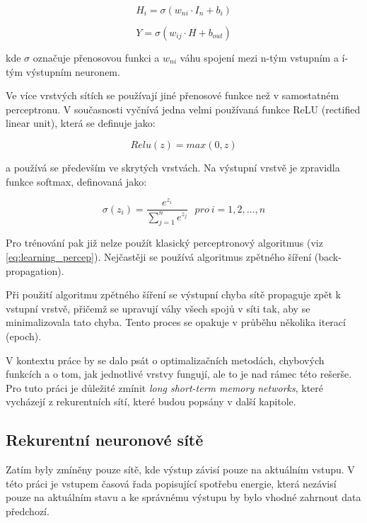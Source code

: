 \documentclass[FM,BP,fonts]{tulthesis}
\begin{document}
\begin{equation}
	H_i = \sigma(w_{ni} \cdot I_n + b_i)
\end{equation}


\begin{equation}
	Y = \sigma(w_{ij} \cdot H + b_{out})
\end{equation}

kde $\sigma$ označuje přenosovou funkci a $w_{ni}$ váhu spojení mezi n-tým vstupním a í-tým výstupním neuronem.

Ve více vrstvých sítích se používají jiné přenosové funkce než v samostatném perceptronu. V současnosti vyčnívá jedna velmi používaná funkce ReLU (rectified linear unit), která se definuje jako:

\begin{equation}
	Relu(z) = max(0, z)
\end{equation}

a používá se především ve skrytých vrstvách. \cite{brownlee2019gentle} Na výstupní vrstvě je zpravidla funkce softmax, definovaná jako:

\begin{equation}
	\sigma(z_i) = \frac{e^{z_{i}}}{\sum_{j=1}^n e^{z_{j}}} \ \ \ pro\ i=1,2,\dots,n
\end{equation}

Pro trénování pak již nelze použít klasický perceptronový algoritmus (viz \ref{eq:learning_percep}). Nejčastěji se používá algoritmus zpětného šíření (back-propagation).

Při použití algoritmu zpětného šíření se výstupní chyba sítě propaguje zpět k vstupní vrstvě, přičemž se upravují váhy všech spojů v síti tak, aby se minimalizovala tato chyba. Tento proces se opakuje v průběhu několika iterací (epoch).

V kontextu práce by se dalo psát o optimalizačních metodách, chybových funkcích a o tom, jak jednotlivé vrstvy fungují, ale to je nad rámec této rešerše. Pro tuto práci je důležité zmínit \textit{long short-term memory networks}, které vycházejí z rekurentních sítí, které budou popsány v další kapitole.


\subsection{Rekurentní neuronové sítě}
Zatím byly zmíněny pouze sítě, kde výstup závisí pouze na aktuálním vstupu. V této práci je vstupem časová řada popisující spotřebu energie, která nezávisí pouze na aktuálním stavu a ke správnému výstupu by bylo vhodné zahrnout data předchozí.
\end{document}
